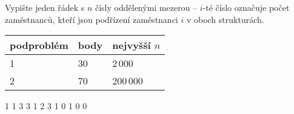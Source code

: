 
Vypište jeden řádek s $n$ čísly oddělenými mezerou -- $i$-té číslo označuje počet
zaměstnanců, kteří jsou podřízení zaměstnanci $i$ v oboch strukturách.


\centering
\begin{tabular}{|l|l|l|}
\hline
podproblém & body & nejvyšší $n$  \\ \hline
1       & 30     & 2\,000          \\ \hline
2       & 70     & 200\,000        \\ \hline
\end{tabular}


1 1 3 3
1 2 3 1
 0 1 0 0 
\sampleEND


